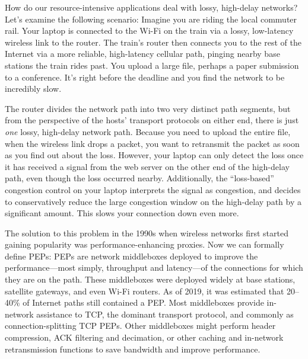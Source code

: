 


How do our resource-intensive applications deal with lossy, high-delay networks?
Let's examine the following scenario: Imagine you are riding the local commuter
rail. Your laptop is connected to the Wi-Fi on the train via a lossy,
low-latency wireless link to the router. The train's router then connects you
to the rest of the Internet via a more reliable, high-latency cellular path,
pinging nearby base stations the train rides past. You upload a large file,
perhaps a paper submission to a conference. It's right before the deadline
and you find the network to be incredibly slow.

The router divides the network path into two very distinct path segments, but
from the perspective of the hosts' transport protocols on either end, there is
just \textit{one} lossy, high-delay network path. Because you need to upload
the entire file, when the wireless link drops a packet, you want to retransmit
the packet as soon as you find out about the loss. However, your laptop can
only detect the loss once it has received a signal from the web server on the
other end of the high-delay path, even though the loss occurred nearby.
Additionally, the ``loss-based'' congestion control on your laptop interprets
the signal as congestion, and decides to conservatively reduce the large
congestion window on the high-delay path by a significant amount. This slows
your connection down even more.

The solution to this problem in the 1990s when wireless networks first started
gaining popularity was performance-enhancing proxies. Now we can formally
define PEPs: PEPs are network middleboxes deployed to improve the
performance---most simply, throughput and latency---of the connections for
which they are on the path. These middleboxes were deployed widely at base
stations, satellite gateways, and even Wi-Fi routers. As of 2019, it was
estimated that 20--40\% of Internet paths still contained a PEP. Most
middleboxes provide in-network assistance to TCP, the dominant transport
protocol, and commonly as connection-splitting TCP PEPs. Other middleboxes
might perform header compression, ACK filtering and decimation, or other
caching and in-network retransmission functions to save bandwidth and improve
performance.

